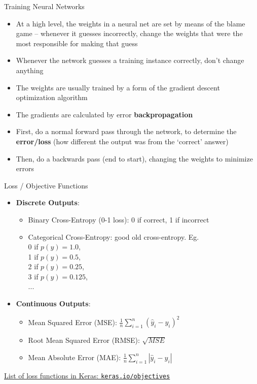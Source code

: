 \documentclass[xcolor=pdftex,x11names,table,hyperref]{beamer}
\begin{document}
\begin{frame}{Training Neural Networks}
\begin{itemize}
	\item At a high level, the weights in a neural net are set by means of the blame game -- whenever it guesses incorrectly, change the weights that were the most responsible for making that guess
	\pause
	\item Whenever the network guesses a training instance correctly, don't change anything
	\pause
	\item The weights are usually trained by a form of the gradient descent optimization algorithm
	\item The gradients are calculated by error \textbf{backpropagation}
	\item First, do a normal forward pass through the network, to determine the \textbf{error/loss} (how different the output was from the `correct' answer)
	\item Then, do a backwards pass (end to start), changing the weights to minimize errors
\end{itemize}
\end{frame}

\begin{frame}{Loss / Objective Functions}
\begin{itemize}
	\item \textbf{Discrete Outputs}:
	\begin{itemize}
		\item Binary Cross-Entropy (0-1 loss): 0 if correct, 1 if incorrect
		\item Categorical Cross-Entropy: good old cross-entropy. Eg.\\ 0 if $p(y)=1.0$, \\ 1 if $p(y) = 0.5$, \\ 2 if $p(y)=0.25$, \\ 3 if $p(y)=0.125$, \\ ...
	\end{itemize}
	\item \textbf{Continuous Outputs}:
	\begin{itemize}
		\item Mean Squared Error (MSE): $\frac{1}{n} \sum_{i=1}^n (\hat{y}_i - y_i)^2$
		\item Root Mean Squared Error (RMSE): $\sqrt{MSE}$
		\item Mean Absolute Error (MAE): $\frac{1}{n} \sum_{i=1}^n |\hat{y}_i - y_i|$
	\end{itemize}
\end{itemize}
\pause
\vspace*{1.0em}
\href{http://keras.io/objectives}{List of loss functions in Keras: \texttt{keras.io/objectives}}
\end{frame}
\end{document}
